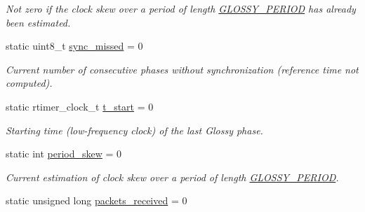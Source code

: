 \begin{DoxyCompactItemize}
\begin{DoxyCompactList}\small\item\em Not zero if the clock skew over a period of length \hyperlink{group__glossy-test-settings_ga6f68058577fdbfccbd8e50537609a5e4}{GLOSSY\_\-PERIOD} has already been estimated. \end{DoxyCompactList}\item 
\hypertarget{group__glossy-test-variables-sched-sync_ga60cbfbbe9faa75c911015ad30087933f}{
static uint8\_\-t \hyperlink{group__glossy-test-variables-sched-sync_ga60cbfbbe9faa75c911015ad30087933f}{sync\_\-missed} = 0}
\label{group__glossy-test-variables-sched-sync_ga60cbfbbe9faa75c911015ad30087933f}

\begin{DoxyCompactList}\small\item\em Current number of consecutive phases without synchronization (reference time not computed). \end{DoxyCompactList}\item 
\hypertarget{group__glossy-test-variables-sched-sync_gac9559510e6d21818f3566cd7429aaca8}{
static rtimer\_\-clock\_\-t \hyperlink{group__glossy-test-variables-sched-sync_gac9559510e6d21818f3566cd7429aaca8}{t\_\-start} = 0}
\label{group__glossy-test-variables-sched-sync_gac9559510e6d21818f3566cd7429aaca8}

\begin{DoxyCompactList}\small\item\em Starting time (low-\/frequency clock) of the last Glossy phase. \end{DoxyCompactList}\item 
\hypertarget{group__glossy-test-variables-sched-sync_ga6168dc578395ee973d219267d7bf97b5}{
static int \hyperlink{group__glossy-test-variables-sched-sync_ga6168dc578395ee973d219267d7bf97b5}{period\_\-skew} = 0}
\label{group__glossy-test-variables-sched-sync_ga6168dc578395ee973d219267d7bf97b5}

\begin{DoxyCompactList}\small\item\em Current estimation of clock skew over a period of length \hyperlink{group__glossy-test-settings_ga6f68058577fdbfccbd8e50537609a5e4}{GLOSSY\_\-PERIOD}. \end{DoxyCompactList}\item 
\hypertarget{group__glossy-test-variables-stats_ga054c8218353e2ee195a4a8bbea380a95}{
static unsigned long \hyperlink{group__glossy-test-variables-stats_ga054c8218353e2ee195a4a8bbea380a95}{packets\_\-received} = 0}
\label{group__glossy-test-variables-stats_ga054c8218353e2ee195a4a8bbea380a95}


\end{DoxyCompactItemize}
